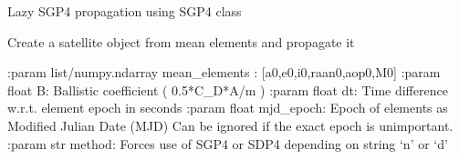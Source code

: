 \documentclass[letterpaper,10pt,english]{sphinxmanual}
\begin{document}

\begin{fulllineitems}
\label{\detokenize{modules/propagator_sgp4:propagator_sgp4.sgp4_propagation}}
Lazy SGP4 propagation using SGP4 class

Create a satellite object from mean elements and propagate it

:param list/numpy.ndarray mean\_elements : {[}a0,e0,i0,raan0,aop0,M0{]}
:param float B: Ballistic coefficient ( 0.5*C\_D*A/m )
:param float dt: Time difference w.r.t. element epoch in seconds
:param float mjd\_epoch: Epoch of elements as Modified Julian Date (MJD) Can be ignored if the exact epoch is unimportant.
:param str method: Forces use of SGP4 or SDP4 depending on string ‘n’ or ‘d’

\end{fulllineitems}

\end{document}
